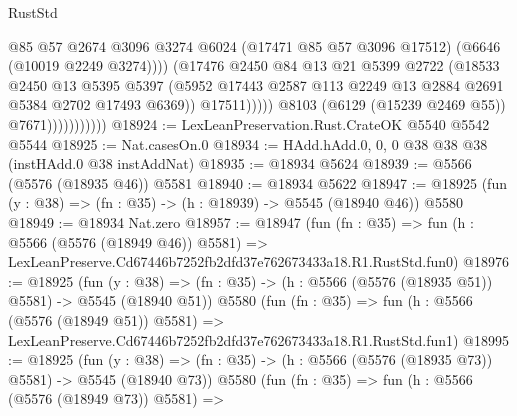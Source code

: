 \begin{lexlean}{RustStd}
\begin{coremodule}
                                      @85
                                      @57
                                      @2674
                                      @3096
                                      @3274
                                      @6024
                                      (@17471 @85 @57 @3096 @17512)
                                      (@6646 (@10019 @2249 @3274))))
                                  (@17476
                                    @2450
                                    @84
                                    @13
                                    @21
                                    @5399
                                    @2722
                                    (@18533
                                      @2450
                                      @13
                                      @5395
                                      @5397
                                      (@5952
                                        @17443
                                        @2587
                                        @113
                                        @2249
                                        @13
                                        @2884
                                        @2691
                                        @5384
                                        @2702
                                        @17493
                                        @6369))
                                    @17511)))))
                          @8103
                          (@6129 (@15239 @2469 @55))
                          @7671)))))))))))
@18924 := LexLeanPreservation.Rust.CrateOK @5540 @5542 @5544
@18925 := Nat.casesOn.{0}
@18934 := HAdd.hAdd.{0, 0, 0} @38 @38 @38 (instHAdd.{0} @38 instAddNat)
@18935 := @18934 @5624
@18939 := @5566 (@5576 (@18935 @46)) @5581
@18940 := @18934 @5622
@18947 := @18925 (fun (y : @38) => (fn : @35) -> (h : @18939) -> @5545 (@18940 @46)) @5580
@18949 := @18934 Nat.zero
@18957 := @18947
    (fun (fn : @35) =>
    fun (h : @5566 (@5576 (@18949 @46)) @5581) =>
    LexLeanPreserve.Cd67446b7252fb2dfd37e762673433a18.R1.RustStd.fun0)
@18976 := @18925
    (fun (y : @38) => (fn : @35) -> (h : @5566 (@5576 (@18935 @51)) @5581) -> @5545 (@18940 @51))
    @5580
    (fun (fn : @35) =>
    fun (h : @5566 (@5576 (@18949 @51)) @5581) =>
    LexLeanPreserve.Cd67446b7252fb2dfd37e762673433a18.R1.RustStd.fun1)
@18995 := @18925
    (fun (y : @38) => (fn : @35) -> (h : @5566 (@5576 (@18935 @73)) @5581) -> @5545 (@18940 @73))
    @5580
    (fun (fn : @35) =>
    fun (h : @5566 (@5576 (@18949 @73)) @5581) =>

\end{coremodule}
\end{lexlean}
